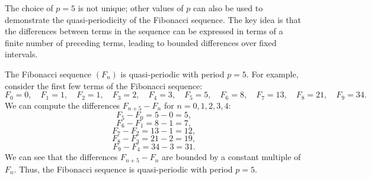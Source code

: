 \documentclass[openany]{book}
\begin{document}
\begin{mynote}
    The choice of $p = 5$ is not unique; other values of $p$ can also be used to demonstrate the quasi-periodicity of the Fibonacci sequence. The key idea is that the differences between terms in the sequence can be expressed in terms of a finite number of preceding terms, leading to bounded differences over fixed intervals.
\end{mynote}
\begin{example}
    The Fibonacci sequence $(F_n)$ is quasi-periodic with period $p = 5$. For example, consider the first few terms of the Fibonacci sequence:
    \[
        F_0 = 0, \quad F_1 = 1, \quad F_2 = 1, \quad F_3 = 2, \quad F_4 = 3, \quad F_5 = 5, \quad F_6 = 8, \quad F_7 = 13, \quad F_8 = 21, \quad F_9 = 34.
    \]
    We can compute the differences $F_{n+5} - F_n$ for $n = 0, 1, 2, 3, 4$:
    \[        F_5 - F_0 = 5 - 0 = 5, \]
    \[        F_6 - F_1 = 8 - 1 =  7, \]
    \[        F_7 - F_2 = 13 - 1 = 12, \]
    \[        F_8 - F_3 = 21 - 2 = 19, \]
    \[        F_9 - F_4 = 34 - 3 = 31. \]
    We can see that the differences $F_{n+5} - F_n$ are bounded by a constant multiple of $F_n$. Thus, the Fibonacci sequence is quasi-periodic with period $p = 5$.
\end{example}
\end{document}

